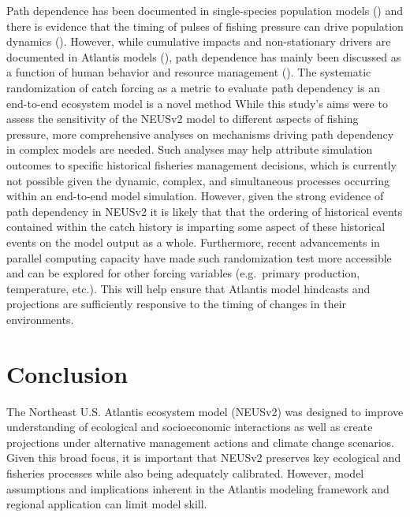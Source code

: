 \documentclass[
]{article}
\begin{document}
Path dependence has been documented in single-species population models () and there is evidence that the timing of pulses of fishing pressure can drive population dynamics (). However, while cumulative impacts and non-stationary drivers are documented in Atlantis models (), path dependence has mainly been discussed as a function of human behavior and resource management (). The systematic randomization of catch forcing as a metric to evaluate path dependency is an end-to-end ecosystem model is a novel method While this study's aims were to assess the sensitivity of the NEUSv2 model to different aspects of fishing pressure, more comprehensive analyses on mechanisms driving path dependency in complex models are needed. Such analyses may help attribute simulation outcomes to specific historical fisheries management decisions, which is currently not possible given the dynamic, complex, and simultaneous processes occurring within an end-to-end model simulation. However, given the strong evidence of path dependency in NEUSv2 it is likely that that the ordering of historical events contained within the catch history is imparting some aspect of these historical events on the model output as a whole. Furthermore, recent advancements in parallel computing capacity have made such randomization test more accessible and can be explored for other forcing variables (e.g.~primary production, temperature, etc.). This will help ensure that Atlantis model hindcasts and projections are sufficiently responsive to the timing of changes in their environments.

\section{Conclusion}\label{conclusion}

The Northeast U.S. Atlantis ecosystem model (NEUSv2) was designed to improve understanding of ecological and socioeconomic interactions as well as create projections under alternative management actions and climate change scenarios. Given this broad focus, it is important that NEUSv2 preserves key ecological and fisheries processes while also being adequately calibrated. However, model assumptions and implications inherent in the Atlantis modeling framework and regional application can limit model skill.
\end{document}
